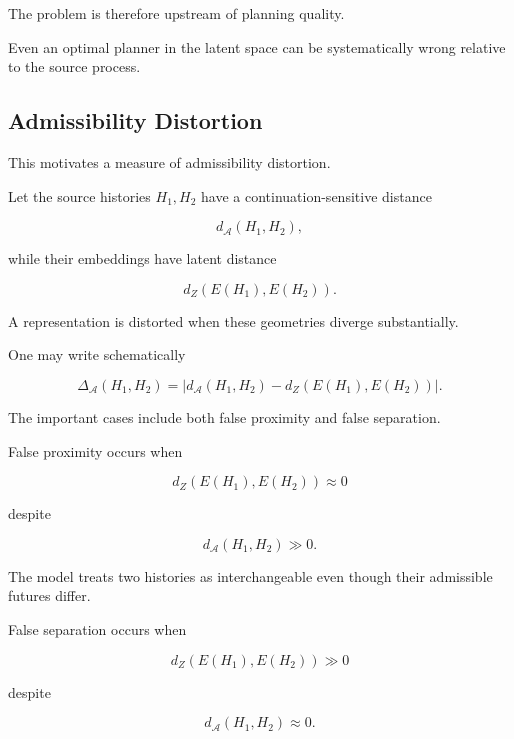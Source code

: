 \documentclass[11pt]{article}
\theoremstyle{remark}
\newcommand{\Adm}{\mathcal{A}}
\begin{document}
The problem is therefore upstream of planning quality.

Even an optimal planner in the latent space can be systematically wrong relative to the source process.

\subsection{Admissibility Distortion}

This motivates a measure of admissibility distortion.

Let the source histories $H_1,H_2$ have a continuation-sensitive distance

\begin{equation}
d_{\Adm}(H_1,H_2),
\end{equation}

while their embeddings have latent distance

\begin{equation}
d_Z(E(H_1),E(H_2)).
\end{equation}

A representation is distorted when these geometries diverge substantially.

One may write schematically

\begin{equation}
\Delta_{\Adm}(H_1,H_2)
=
\left|
d_{\Adm}(H_1,H_2)
-
d_Z(E(H_1),E(H_2))
\right|.
\end{equation}

The important cases include both false proximity and false separation.

False proximity occurs when

\begin{equation}
d_Z(E(H_1),E(H_2))\approx 0
\end{equation}

despite

\begin{equation}
d_{\Adm}(H_1,H_2)\gg 0.
\end{equation}

The model treats two histories as interchangeable even though their admissible futures differ.

False separation occurs when

\begin{equation}
d_Z(E(H_1),E(H_2))\gg 0
\end{equation}

despite

\begin{equation}
d_{\Adm}(H_1,H_2)\approx 0.
\end{equation}
\end{document}
